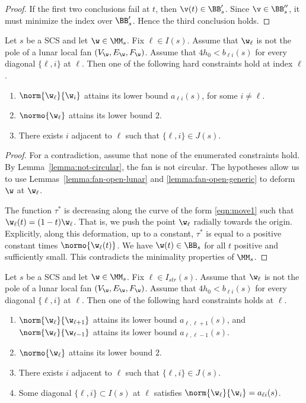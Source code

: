 \begin{proof}
If the first two conclusions fail at $t$, then $\v(t)\in \BB'_s$.  Since $\v\in\BB''_s$,
it must minimize the index over $\BB'_s$.  Hence the third conclusion holds.
\end{proof}


\begin{lemma}\label{lemma:odx2} 
Let $s$ be a SCS and let $\w\in \MM_s$.  Fix $\ell\in I(s)$.
Assume  that $\w_\ell$ is not the pole of a lunar local fan $(V_\w,E_\w,F_\w)$.
Assume that $4h_0 < b_{\ell i}(s)$ for every diagonal $\{\ell,i\}$ at $\ell$.
Then one of the following hard  constraints hold at index $\ell$.
\begin{enumerate}
\item $\norm{\w_\ell}{\w_i}$ attains its lower bound $a_{\ell i}(s)$, for
  some $i\ne \ell$.
\item $\normo{\w_\ell}$ attains its lower bound $2$.
\item There exists $i$ adjacent to $\ell$ such that $\{\ell,i\}\in J(s)$.
\end{enumerate}
\end{lemma}

\begin{proof} 
For a contradiction, assume that none of the enumerated constraints hold.
By Lemma~\ref{lemma:not-circular}, the fan is not circular.
The hypotheses
allow us to use Lemmas~\ref{lemma:fan-open-lunar} and
\ref{lemma:fan-open-generic} to deform $\w$ at $\w_\ell$.

The function $\tau^*$ is decreasing along
the curve of the form \eqref{eqn:move1} such that
$\w_\ell(t)=(1-t) \w_\ell$.
That is, we push the point $\w_\ell$ radially towards the origin.
Explicitly, along this deformation, up to a constant, $\tau^*$ is equal
to a positive constant times $\normo{\w_\ell(t)}$.
We have
$\w(t)\in \BB_s$ for all $t$ positive and sufficiently
small.  This contradicts the minimality properties of $\MM_s$.
\end{proof}

\begin{lemma}\label{lemma:imj2}
Let $s$ be a SCS and let $\w\in \MM_s$.   Fix $\ell\in I_{str}(s)$.  
Assume  that $\w_\ell$ is not the pole of a lunar local fan $(V_\w,E_\w,F_\w)$.
Assume that $4h_0 < b_{\ell i}(s)$ for every diagonal $\{\ell,i\}$ at $\ell$.
Then one of the following hard constraints holds at $\ell$.
\begin{enumerate}
\item $\norm{\w_\ell}{\w_{\ell+1}}$ attains its lower bound $a_{\ell,\ell+1}(s)$, and
 $\norm{\w_\ell}{\w_{\ell-1}}$ attains its lower bound $a_{\ell,\ell-1}(s)$.
\item $\normo{\w_\ell}$ attains its lower bound $2$.
\item There exists $i$ adjacent to $\ell$ such that $\{\ell,i\}\in J(s)$.
\item Some diagonal $\{\ell,i\}\subset I(s)$ at $\ell$ satisfies
$\norm{\w_\ell}{\w_i}=a_{\ell i}(s)$.
\end{enumerate}
\end{lemma}

